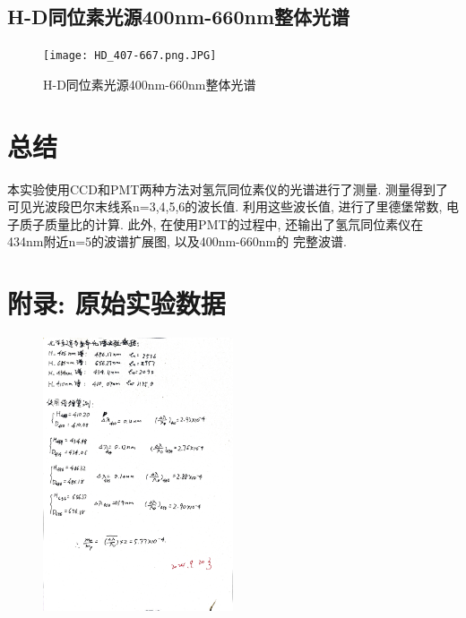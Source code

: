 \documentclass[12pt,a4paper]{article}
\begin{document}
\subsection{H-D同位素光源400nm-660nm整体光谱}
\begin{figure}[H]
    \centering
    \texttt{[image: HD\_407-667.png.JPG]}
    \caption{H-D同位素光源400nm-660nm整体光谱}
\end{figure}


\section{总结}
本实验使用CCD和PMT两种方法对氢氘同位素仪的光谱进行了测量. 测量得到了可见光波段巴尔末线系n=3,4,5,6的波长值. 
利用这些波长值, 进行了里德堡常数, 电子质子质量比的计算. 此外, 在使用PMT的过程中, 还输出了氢氘同位素仪在434nm附近n=5的波谱扩展图, 以及400nm-660nm的
完整波谱. 
\section{附录: 原始实验数据}
\begin{figure}[H]
    \centering
    \includegraphics[width=0.5\textwidth]{Appendix.jpg}
\end{figure}
\end{document}
